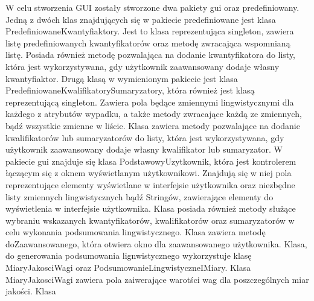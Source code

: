 \documentclass{classrep}
\begin{document}
W celu stworzenia GUI zostały stworzone dwa pakiety gui oraz predefiniowany. Jedną z dwóch klas znajdujących się w pakiecie predefiniowane jest klasa PredefiniowaneKwantyfiaktory. Jest to klasa reprezentująca singleton, zawiera listę predefiniowanych kwantyfikatorów oraz metodę zwracająca wspomnianą listę. Posiada również metodę pozwalająca na dodanie kwantyfikatora do listy, która jest wykorzystywana, gdy użytkownik zaawansowany dodaje własny kwantyfiaktor. Drugą klasą w wymienionym pakiecie jest klasa PredefiniowaneKwalifikatorySumaryzatory, która również jest klasą reprezentującą singleton. Zawiera pola będące zmiennymi lingwistycznymi dla każdego z atrybutów wypadku, a także metody zwracające każdą ze zmiennych, bądź wszystkie zmienne w liście. Klasa zawiera metody pozwalające na dodanie kwalifikatorów lub sumaryzatorów do listy, która jest wykorzystywana, gdy użytkownik zaawansowany dodaje własny kwalifikator lub sumaryzator. W pakiecie gui znajduje się klasa PodstawowyUzytkownik, która jest kontrolerem łączącym się z oknem wyświetlanym użytkownikowi. Znajdują się w niej pola reprezentujące elementy wyświetlane w interfejsie użytkownika oraz niezbędne listy zmiennych lingwistycznych bądź Stringów, zawierające elementy do wyświetlenia w interfejsie użytkownika. Klasa posiada również metody służące wybraniu wskazanych kwantyfikatorów, kwalifikatorów oraz sumaryzatorów w celu wykonania podsumowania lingwistycznego. Klasa zawiera metodę doZaawansowanego, która otwiera okno dla zaawansowanego użytkownika. Klasa, do generowania podsumowania lignwistycznego wykorzystuje klasę MiaryJakosciWagi oraz PodsumowanieLingwistyczneIMiary. Klasa MiaryJakosciWagi zawiera pola zaiwerające warotści wag dla poszczególnych miar jakości. Klasa 
\end{document}
